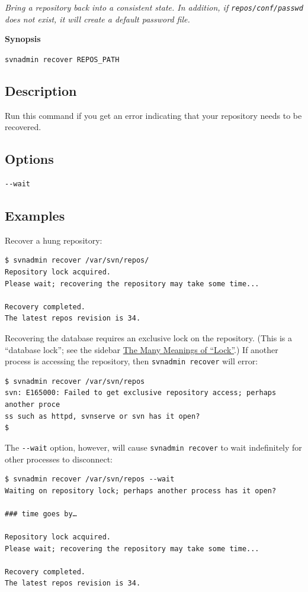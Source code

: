 \emph{Bring a repository back into a consistent state. In addition, if
\texttt{repos/conf/passwd} does not exist, it will create a default
password file.}

\textbf{Synopsis}

\texttt{svnadmin\ recover\ REPOS\_PATH}

\subsection{Description}

Run this command if you get an error indicating that your repository
needs to be recovered.

\subsection{Options}

\begin{verbatim}
--wait
\end{verbatim}

\subsection{Examples}

Recover a hung repository:

\begin{verbatim}
$ svnadmin recover /var/svn/repos/ 
Repository lock acquired.
Please wait; recovering the repository may take some time...

Recovery completed.
The latest repos revision is 34.
\end{verbatim}

Recovering the database requires an exclusive lock on the repository.
(This is a ``database lock''; see the sidebar
\hyperref[svn.advanced.locking.meanings]{The Many Meanings of
``Lock''}.) If another process is accessing the repository, then
\texttt{svnadmin\ recover} will error:

\begin{verbatim}
$ svnadmin recover /var/svn/repos
svn: E165000: Failed to get exclusive repository access; perhaps another proce
ss such as httpd, svnserve or svn has it open?
$
\end{verbatim}

The \texttt{-\/-wait} option, however, will cause
\texttt{svnadmin\ recover} to wait indefinitely for other processes to
disconnect:

\begin{verbatim}
$ svnadmin recover /var/svn/repos --wait
Waiting on repository lock; perhaps another process has it open?

### time goes by…

Repository lock acquired.
Please wait; recovering the repository may take some time...

Recovery completed.
The latest repos revision is 34.
\end{verbatim}

